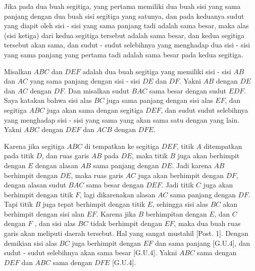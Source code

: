 \documentclass[a4paper]{book}
\begin{document}
Jika pada dua buah segitiga, yang pertama  memiliki dua buah sisi yang sama 
panjang dengan dua buah sisi segitiga yang satunya, dan pada keduanya sudut
yang diapit oleh sisi - sisi yang sama panjang tadi adalah sama besar, 
maka alas (sisi ketiga) dari kedua segitiga tersebut adalah sama besar, dan kedua 
segitiga tersebut akan sama, dan sudut - sudut selebihnya yang menghadap dua 
sisi - sisi yang sama panjang yang pertama tadi adalah sama besar pada 
kedua segitiga.
\begin{center}
\end{center}

Misalkan $ABC$ dan $DEF$ adalah dua buah segitiga yang memiliki 
sisi - sisi $AB$ dan $AC$ yang sama panjang dengan sisi - sisi $DE$ dan $DF$.
Yakni $AB$ dengan $DE$  dan $AC$ dengan $DF$. Dan misalkan sudut $BAC$ sama
besar dengan sudut $EDF$. Saya katakan bahwa sisi alas $BC$ juga sama panjang
dengan  sisi alas $EF$, dan segitiga $ABC$ juga akan sama dengan segitiga 
$DEF$, dan sudut sudut selebihnya yang menghadap sisi - sisi yang sama yang 
akan sama satu dengan yang lain. Yakni $ABC$ dengan $DEF$ dan $ACB$ dengan 
$DFE$.

Karena jika segitiga $ABC$ di tempatkan ke segitiga $DEF$, titik $A$ 
ditempatkan pada titik $D$, dan ruas garis $AB$ pada $DE$, maka
titik $B$ juga akan berhimpit dengan $E$ dengan alasan $AB$ sama panjang
dengan $DE$. Jadi karena $AB$ berhimpit dengan $DE$, maka ruas garis $AC$ 
juga akan berhimpit dengan $DF$, dengan alasan sudut $BAC$ sama besar 
dengan $DEF$. Jadi titik $C$ juga akan berhimpit dengan titik $F$, lagi
dikarenakan alasan $AC$ sama panjang dengan $DF$. Tapi titik $B$ juga tepat
berhimpit dengan titik $E$, sehingga sisi alas $BC$ akan berhimpit
dengan sisi alan $EF$. Karena jika $B$ berhimpitan dengan $E$, dan $C$ dengan
$F$ , dan sisi alas $BC$ tidak berhimpit dengan $EF$, maka dua buah ruas
garis akan meliputi daerah tersebut. Hal yang sangat mustahil [Post. 1].
Dengan demikian sisi alas $BC$ juga berhimpit dengan $EF$ dan sama panjang
[G.U.4], dan sudut - sudut selebihnya akan sama besar [G.U.4]. Yakni
$ABC$ sama dengan $DEF$ dan $ABC$ sama dengan $DFE$ [G.U.4].
\end{document}
